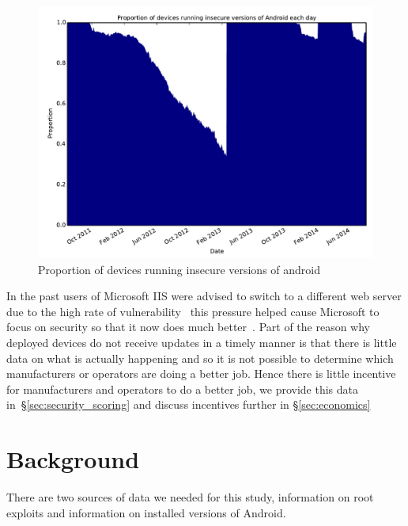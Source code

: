 \documentclass[conference,a4paper,twoside]{IEEEtran}
\begin{document}
\begin{figure}[!b]
\centering
\includegraphics[width=\columnwidth]{figures/proportioninsecure}
\caption{Proportion of devices running insecure versions of android}
\label{fig:proportioninsecure}
\end{figure}

In the past users of Microsoft IIS were advised to switch to a different web server due to the high rate of vulnerability~\cite{Pescatore2001} this pressure helped cause Microsoft to focus on security so that it now does much better~\cite{TODO}.
Part of the reason why deployed devices do not receive updates in a timely manner is that there is little data on what is actually happening and so it is not possible to determine which manufacturers or operators are doing a better job.
Hence there is little incentive for manufacturers and operators to do a better job, we provide this data  in~\S\ref{sec:security_scoring} and discuss incentives further in \S\ref{sec:economics}

\section{Background}
\label{sec:background}
There are two sources of data we needed for this study, information on root exploits and information on installed versions of Android.
\end{document}
